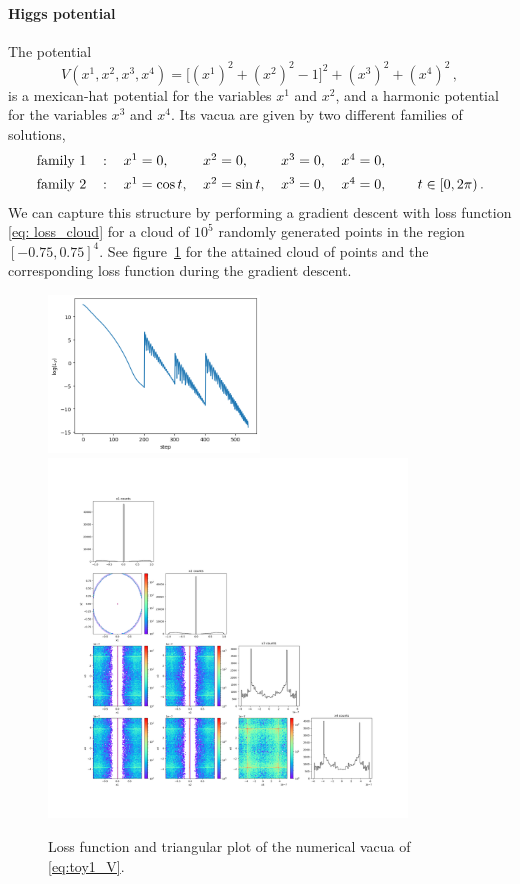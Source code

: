 \documentclass[11pt]{article}
\begin{document}
\paragraph{Higgs potential}
The potential
%
\begin{equation}	\label{eq:toy1_V}
	V(x^1,x^2,x^3,x^4) = \big[(x^1)^2+(x^2)^2-1\big]^2+(x^3)^2+(x^4)^2\,,
\end{equation}
%
is a mexican-hat potential for the variables $x^1$ and $x^2$, and a harmonic potential for the variables $x^3$ and $x^4$.
Its vacua are given by two different families of solutions,
%
\begin{equation}	\label{eq: toy1_CM}
	\begin{tabular}{rcllll}
	family 1	&:& $x^1=0$,	& $x^2=0$,	& $x^3=0$,	& $x^4=0$,	\\[5pt]
	family 2	&:& $x^1=\cos t$,	& $x^2=\sin t$,	& $x^3=0$,	& $x^4=0$,	\qquad $t\in[0,2\pi)$\,.
	\end{tabular}
\end{equation}
%
We can capture this structure by performing a gradient descent with loss function \eqref{eq: loss_cloud} 
for a cloud of $10^5$ randomly generated points in the region $[-0.75,0.75]^4$. 
See figure~\ref{fig: toy1_cloud} for the attained cloud of points and the corresponding loss function during
the gradient descent.
%
\begin{figure}
	\centering
	\includegraphics[width=0.5\textwidth]{Figures/loss_cloud_Higgs.png}	\\
	\includegraphics[width=0.85\textwidth]{Figures/triangle_higgs.png}
	\caption{Loss function and triangular plot of the numerical vacua of \eqref{eq:toy1_V}.}
	\label{fig: toy1_cloud}
\end{figure}
%
\end{document}
